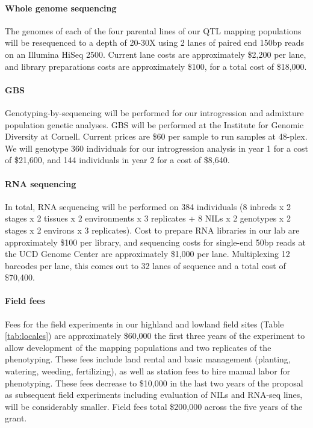 \paragraph{Whole genome sequencing}
The genomes of each of the four parental lines of our QTL mapping populations will be resequenced to a depth of 20-30X using 2 lanes of paired end 150bp reads on an Illumina HiSeq 2500. Current lane costs are approximately \$2,200 per lane, and library preparations costs are approximately \$100, for a total cost of \$18,000.

\paragraph{GBS}
Genotyping-by-sequencing will be performed for our introgression and admixture population genetic analyses. GBS will be performed at the Institute for Genomic Diversity at Cornell.  Current prices are \$60 per sample to run samples at 48-plex.  We will genotype 360 individuals for our introgression analysis in year 1 for a cost of \$21,600, and 144 individuals in year 2 for a cost of \$8,640. 

\paragraph{RNA sequencing}
In total, RNA sequencing will be performed on 384 individuals (8 inbreds x 2 stages x 2 tissues x 2 environments x 3 replicates + 8 NILs x 2 genotypes x 2 stages x 2 environs x 3 replicates).  Cost to prepare RNA libraries in our lab are approximately \$100 per library, and sequencing costs for single-end 50bp reads at the UCD Genome Center are approximately \$1,000 per lane.  Multiplexing 12 barcodes per lane, this comes out to 32 lanes of sequence and a total cost of \$70,400.

\paragraph{Field fees}
Fees for the field experiments in our highland and lowland field sites (Table \ref{tab:locales}) are approximately \$60,000 the first three years of the experiment to allow development of the mapping populations and two replicates of the phenotyping.  These fees include land rental and basic management (planting, watering, weeding, fertilizing), as well as station fees to hire manual labor for phenotyping.  These fees decrease to \$10,000 in the last two years of the proposal as subsequent field experiments including evaluation of NILs and RNA-seq lines, will be considerably smaller. Field fees total \$200,000 across the five years of the grant.

